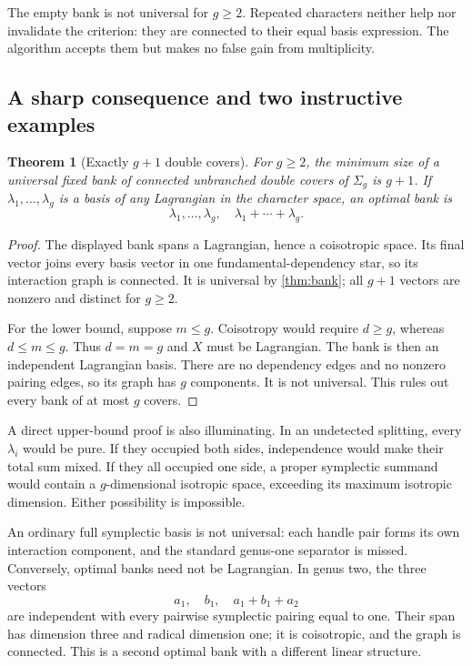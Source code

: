 \documentclass[11pt,letterpaper]{article}
\newtheorem{theorem}{Theorem}[section]
\theoremstyle{definition}
\theoremstyle{remark}
\begin{document}
The empty bank is not universal for $g\ge2$. Repeated characters neither help nor invalidate the criterion: they are connected to their equal basis expression. The algorithm accepts them but makes no false gain from multiplicity.

\subsection{A sharp consequence and two instructive examples}
\begin{theorem}[Exactly $g+1$ double covers]\label{thm:optimal}
For $g\ge2$, the minimum size of a universal fixed bank of connected unbranched double covers of $\Sigma_g$ is $g+1$. If $\lambda_1,\ldots,\lambda_g$ is a basis of any Lagrangian in the character space, an optimal bank is
\[
 \lambda_1,\ldots,\lambda_g,\quad \lambda_1+\cdots+\lambda_g.
\]
\end{theorem}
\begin{proof}
The displayed bank spans a Lagrangian, hence a coisotropic space. Its final vector joins every basis vector in one fundamental-dependency star, so its interaction graph is connected. It is universal by \cref{thm:bank}; all $g+1$ vectors are nonzero and distinct for $g\ge2$.

For the lower bound, suppose $m\le g$. Coisotropy would require $d\ge g$, whereas $d\le m\le g$. Thus $d=m=g$ and $X$ must be Lagrangian. The bank is then an independent Lagrangian basis. There are no dependency edges and no nonzero pairing edges, so its graph has $g$ components. It is not universal. This rules out every bank of at most $g$ covers.
\end{proof}

A direct upper-bound proof is also illuminating. In an undetected splitting, every $\lambda_i$ would be pure. If they occupied both sides, independence would make their total sum mixed. If they all occupied one side, a proper symplectic summand would contain a $g$-dimensional isotropic space, exceeding its maximum isotropic dimension. Either possibility is impossible.

An ordinary full symplectic basis is not universal: each handle pair forms its own interaction component, and the standard genus-one separator is missed. Conversely, optimal banks need not be Lagrangian. In genus two, the three vectors
\[
 a_1,\quad b_1,\quad a_1+b_1+a_2
\]
are independent with every pairwise symplectic pairing equal to one. Their span has dimension three and radical dimension one; it is coisotropic, and the graph is connected. This is a second optimal bank with a different linear structure.
\end{document}

